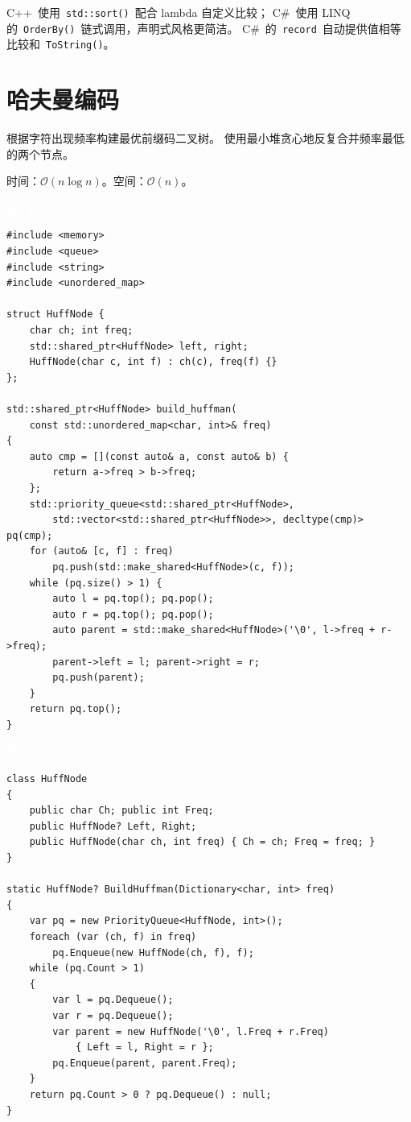 \documentclass[12pt,a4paper,fontset=fandol]{ctexbook}
\newcommand{\cpplabel}{%
  \noindent\begin{tcolorbox}[sharp corners,colback=cppheadbg,colframe=cppheadbg,
    left=6pt,right=6pt,top=2pt,bottom=2pt,boxrule=0pt]
  \textcolor{white}{\small\bfseries\sffamily C++}\end{tcolorbox}%
}
\newcommand{\csharplabel}{%
  \noindent\begin{tcolorbox}[sharp corners,colback=csharpheadbg,colframe=csharpheadbg,
    left=6pt,right=6pt,top=2pt,bottom=2pt,boxrule=0pt]
  \textcolor{white}{\small\bfseries\sffamily C\#}\end{tcolorbox}%
}
\newcommand{\bigO}[1]{\mathcal{O}(#1)}
\newcommand{\Fn}[1]{\texttt{#1()}}
\begin{document}
\begin{compare}
C++~使用~\Fn{std::sort}~配合 lambda 自定义比较；
C\#~使用 LINQ 的~\Fn{OrderBy}~链式调用，声明式风格更简洁。
C\#~的~\texttt{record}~自动提供值相等比较和~\Fn{ToString}。
\end{compare}

\chapter{哈夫曼编码}

根据字符出现频率构建最优前缀码二叉树。
使用最小堆贪心地反复合并频率最低的两个节点。

\begin{complexitybox}
  时间：$\bigO{n \log n}$。空间：$\bigO{n}$。
\end{complexitybox}

\cpplabel
\begin{lstlisting}[style=cppstyle]
#include <memory>
#include <queue>
#include <string>
#include <unordered_map>

struct HuffNode {
    char ch; int freq;
    std::shared_ptr<HuffNode> left, right;
    HuffNode(char c, int f) : ch(c), freq(f) {}
};

std::shared_ptr<HuffNode> build_huffman(
    const std::unordered_map<char, int>& freq)
{
    auto cmp = [](const auto& a, const auto& b) {
        return a->freq > b->freq;
    };
    std::priority_queue<std::shared_ptr<HuffNode>,
        std::vector<std::shared_ptr<HuffNode>>, decltype(cmp)> pq(cmp);
    for (auto& [c, f] : freq)
        pq.push(std::make_shared<HuffNode>(c, f));
    while (pq.size() > 1) {
        auto l = pq.top(); pq.pop();
        auto r = pq.top(); pq.pop();
        auto parent = std::make_shared<HuffNode>('\0', l->freq + r->freq);
        parent->left = l; parent->right = r;
        pq.push(parent);
    }
    return pq.top();
}
\end{lstlisting}

\csharplabel
\begin{lstlisting}[style=csharpstyle]
class HuffNode
{
    public char Ch; public int Freq;
    public HuffNode? Left, Right;
    public HuffNode(char ch, int freq) { Ch = ch; Freq = freq; }
}

static HuffNode? BuildHuffman(Dictionary<char, int> freq)
{
    var pq = new PriorityQueue<HuffNode, int>();
    foreach (var (ch, f) in freq)
        pq.Enqueue(new HuffNode(ch, f), f);
    while (pq.Count > 1)
    {
        var l = pq.Dequeue();
        var r = pq.Dequeue();
        var parent = new HuffNode('\0', l.Freq + r.Freq)
            { Left = l, Right = r };
        pq.Enqueue(parent, parent.Freq);
    }
    return pq.Count > 0 ? pq.Dequeue() : null;
}
\end{lstlisting}
\end{document}
